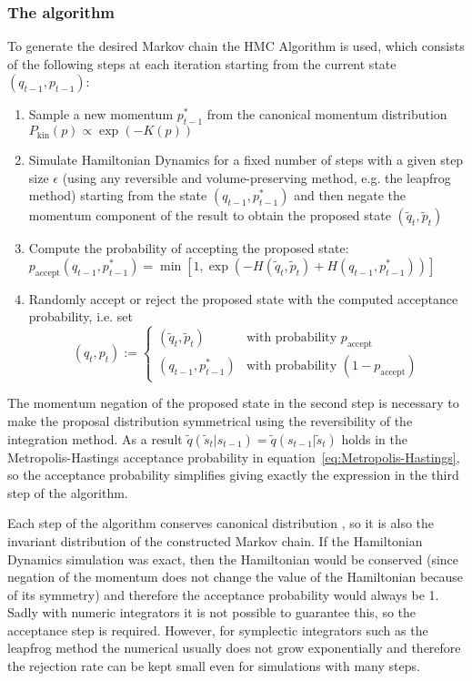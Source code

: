 \documentclass[12pt]{scrartcl}
\begin{document}
\subsubsection{The algorithm}
To generate the desired Markov chain the HMC Algorithm \citep{Neal2011} is used, which consists of the following steps at each iteration starting from the current state $(q_{t-1}, p_{t-1})$:
\begin{enumerate}
\item Sample a new momentum $p^*_{t-1}$ from the canonical momentum distribution $P_\textrm{kin}(p) \propto \exp{(-K(p))}$
\item Simulate Hamiltonian Dynamics for a fixed number of steps with a given step size $\epsilon$ (using any reversible and volume-preserving method, e.g. the leapfrog method) starting from the state $(q_{t-1}, p^*_{t-1})$ and then negate the momentum component of the result to obtain the proposed state $(\tilde{q}_t, \tilde{p}_t)$
\item Compute the probability of accepting the proposed state: \\
$p_{\textrm{accept}}(q_{t-1}, p^*_{t-1}) = \min[1, \exp(-H(\tilde{q}_t, \tilde{p}_t) + H(q_{t-1}, p^*_{t-1}))]$
\item Randomly accept or reject the proposed state with the computed acceptance probability, i.e. set \begin{equation}
(q_t, p_t) := \begin{cases} (\tilde{q}_t, \tilde{p}_t) & \textrm{with probability } p_{\textrm{accept}} \\ 
											(q_{t-1}, p^*_{t-1}) 			& \textrm{with probability } (1 - p_{\textrm{accept}})
					  \end{cases}
\end{equation}
\end{enumerate}
The momentum negation of the proposed state in the second step is necessary to make the proposal distribution symmetrical using the reversibility of the integration method. As a result $\tilde{q}(\tilde{s}_t|s_{t-1}) = \tilde{q}(s_{t-1}|\tilde{s}_t)$ holds in the Metropolis-Hastings acceptance probability in equation~\eqref{eq:Metropolis-Hastings}, so the acceptance probability simplifies giving exactly the expression in the third step of the algorithm.

Each step of the algorithm conserves canonical distribution \citep{Neal2011}, so it is also the invariant distribution of the constructed Markov chain. If the Hamiltonian Dynamics simulation was exact, then the Hamiltonian would be conserved (since negation of the momentum does not change the value of the Hamiltonian because of its symmetry) and therefore the acceptance probability would always be 1. Sadly with numeric integrators it is not possible to guarantee this, so the acceptance step is required. However, for symplectic integrators such as the leapfrog method the numerical usually does not grow exponentially and therefore the rejection rate can be kept small even for simulations with many steps.
\end{document}
